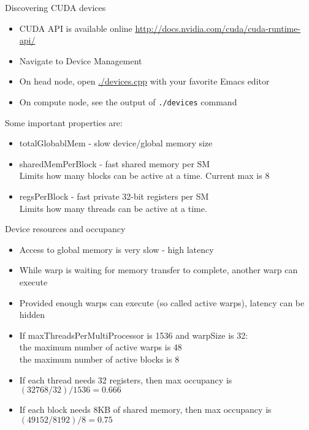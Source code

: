 \documentclass{beamer}
\begin{document}
\begin{frame}[fragile]{Discovering CUDA devices}
\begin{itemize}
  \item CUDA API is available online
    \url{http://docs.nvidia.com/cuda/cuda-runtime-api/}
  \item Navigate to Device Management
  \item On head node, open \url{./devices.cpp} with your favorite Emacs editor
  \item On compute node, see the output of {\tt ./devices} command
\end{itemize}

Some important properties are:
\begin{itemize}
  \item totalGlobablMem - slow device/global memory size
  \item sharedMemPerBlock - fast shared memory per SM \\
    Limits how many blocks can be active at a time.  Current max is 8
  \item regsPerBlock - fast private 32-bit registers per SM \\
    Limits how many threads  can be active at a time. 
\end{itemize}
\end{frame}

\begin{frame}[fragile]{Device resources and occupancy}
\begin{itemize}
  \item Access to global memory is very slow - high latency
  \item While warp is waiting for memory transfer to complete, another warp can execute
  \item Provided enough warps can execute (so called active warps), latency can be hidden
  \item If maxThreadsPerMultiProcessor is 1536 and warpSize is 32: \\
    the maximum number of active warps is 48 \\
    the maximum number of active blocks is 8
  \item If each thread needs 32 registers,
    then max occupancy is $(32768/32)/1536 = 0.666$
  \item If each block needs 8KB of shared memory,
    then max occupancy is $(49152/8192)/8 = 0.75$
\end{itemize}
\end{frame}
\end{document}
